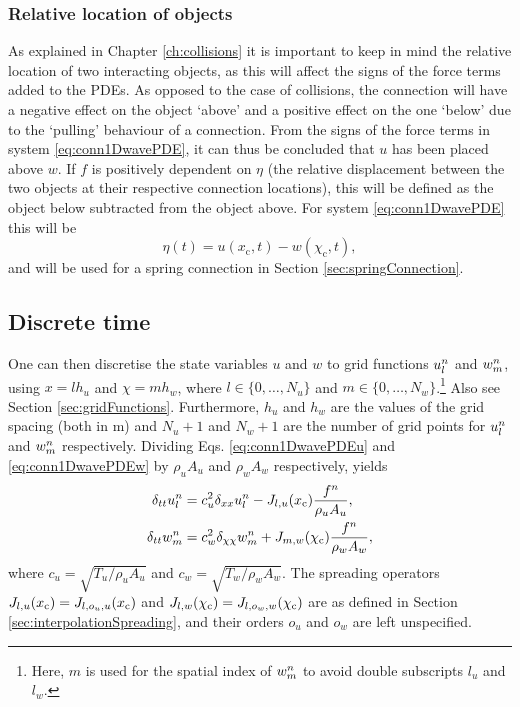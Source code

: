 \subsubsection{Relative location of objects}
As explained in Chapter \ref{ch:collisions} it is important to keep in mind the relative location of two interacting objects, as this will affect the signs of the force terms added to the PDEs. As opposed to the case of collisions, the connection will have a negative effect on the object `above' and a positive effect on the one `below' due to the `pulling' behaviour of a connection.
From the signs of the force terms in system \eqref{eq:conn1DwavePDE}, it can thus be concluded that $u$ has been placed above $w$. If $f$ is positively dependent on $\eta$ (the relative displacement between the two objects at their respective connection locations), this will be defined as the object below subtracted from the object above. For system \eqref{eq:conn1DwavePDE} this will be
\begin{equation}
    \eta(t) = u(x_\text{c}, t) - w(\chi_\text{c}, t),
\end{equation}
and will be used for a spring connection in Section \ref{sec:springConnection}.

\subsection{Discrete time}
One can then discretise the state variables $u$ and $w$ to grid functions $u_l^n$ and $w_m^n$, using $x = lh_u$ and $\chi = mh_w$, where $l\in \{0, \hdots, N_u\}$ and $m\in \{0, \hdots, N_w\}$.\footnote{Here, $m$ is used for the spatial index of $w_m^n$ to avoid double subscripts $l_u$ and $l_w$.} Also see Section \ref{sec:gridFunctions}. Furthermore, $h_u$ and $h_w$ are the values of the grid spacing (both in m) and $N_u+1$ and $N_w+1$ are the number of grid points for $u_l^n$ and $w_m^n$ respectively. Dividing Eqs. \eqref{eq:conn1DwavePDEu} and \eqref{eq:conn1DwavePDEw} by $\rho_u A_u$ and $\rho_w A_w$ respectively, yields
\begin{subequations}\label{eq:conn1DwaveFDS}
    \begin{align}
        \delta_{tt} u_l^n &= c_u^2 \delta_{xx} u_l^n -J_{l, u}(x_{\text{c}})\frac{f^n}{\rho_u A_u}, \label{eq:conn1DwaveFDSu} \\
        \delta_{tt} w_m^n &= c_w^2 \delta_{\chi\chi} w_m^n + J_{m, w}(\chi_{\text{c}})\frac{f^n}{\rho_w A_w},\label{eq:conn1DwaveFDSw}
    \end{align}
\end{subequations}
where $c_u = \sqrt{T_u / \rho_uA_u}$ and $c_w = \sqrt{T_w / \rho_wA_w}$. The spreading operators $J_{l, u}(x_{\text{c}}) = J_{l, o_u, u}(x_{\text{c}})$ and $J_{l, w}(\chi_{\text{c}}) = J_{l, o_w, w}(\chi_{\text{c}})$ are as defined in Section \ref{sec:interpolationSpreading}, and their orders $o_u$ and $o_w$ are left unspecified.

